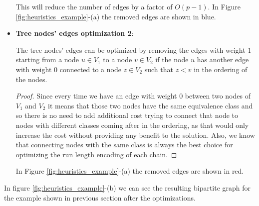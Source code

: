 \begin{itemize}
    This will reduce the number of edges by a factor of $O(p - 1)$. In Figure \ref{fig:heuristics_example}-(a) the removed edges are shown in blue.

    \item \textbf{Tree nodes' edges optimization 2}:
    \begin{lemma} \label{lemma:tree_optimization_2}
        The tree nodes' edges can be optimized by removing the edges with weight $1$ starting from a node $u \in V_1$ to a node $v \in V_2$ if the node $u$ has another edge with weight $0$ connected to a node $z \in V_2$ such that $z < v$ in the ordering of the nodes.
    \end{lemma}

    \begin{proof}
        Since every time we have an edge with weight $0$ between two nodes of $V_1$ and $V_2$ it means that those two nodes have the same equivalence class and so there is no need to add additional cost trying to connect that node to nodes with different classes coming after in the ordering, as that would only increase the cost without providing any benefit to the solution. Also, we know that connecting nodes with the same class is always the best choice for optimizing the run length encoding of each chain.
    \end{proof}

    In Figure \ref{fig:heuristics_example}-(a) the removed edges are shown in red.
\end{itemize}

In figure \ref{fig:heuristics_example}-(b) we can see the resulting bipartite graph for the example shown in previous section after the optimizations.

